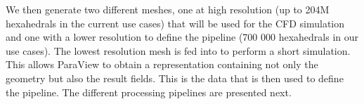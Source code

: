 We then generate two different meshes, one at high resolution (up to 204M
hexahedrals in the current use cases) that will be used for the CFD
simulation and one with a lower resolution to define the pipeline (700 000
hexahedrals in our use cases). The lowest resolution mesh is fed into \CS to perform a short
simulation. This allows ParaView to obtain a representation containing not
only the geometry but also the result fields. This is the data that is then used to define the pipeline.
The different processing pipelines are presented next.
